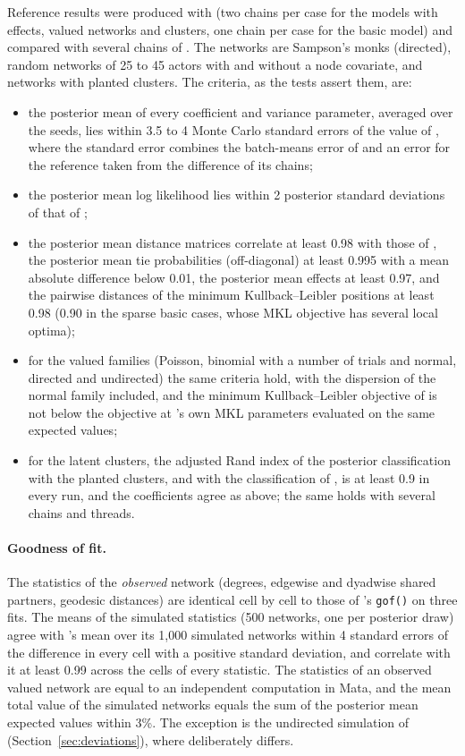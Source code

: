 Reference results were produced with \latentnet{} (two chains per case for the models with effects, valued networks and clusters, one chain per case for the basic model) and compared with several chains of \nwlsm{}. The networks are Sampson's monks (directed), random networks of 25 to 45 actors with and without a node covariate, and networks with planted clusters. The criteria, as the tests assert them, are:
\begin{itemize}[nosep]
  \item the posterior mean of every coefficient and variance parameter, averaged over the seeds, lies within 3.5 to 4 Monte Carlo standard errors of the value of \latentnet{}, where the standard error combines the batch-means error of \nwlsm{} and an error for the reference taken from the difference of its chains;
  \item the posterior mean log likelihood lies within 2 posterior standard deviations of that of \latentnet{};
  \item the posterior mean distance matrices correlate at least 0.98 with those of \latentnet{}, the posterior mean tie probabilities (off-diagonal) at least 0.995 with a mean absolute difference below 0.01, the posterior mean effects at least 0.97, and the pairwise distances of the minimum Kullback--Leibler positions at least 0.98 (0.90 in the sparse basic cases, whose MKL objective has several local optima);
  \item for the valued families (Poisson, binomial with a number of trials and normal, directed and undirected) the same criteria hold, with the dispersion of the normal family included, and the minimum Kullback--Leibler objective of \nwlsm{} is not below the objective at \latentnet{}'s own MKL parameters evaluated on the same expected values;
  \item for the latent clusters, the adjusted Rand index of the posterior classification with the planted clusters, and with the classification of \latentnet{}, is at least 0.9 in every run, and the coefficients agree as above; the same holds with several chains and threads.
\end{itemize}

\paragraph{Goodness of fit.} The statistics of the \emph{observed} network (degrees, edgewise and dyadwise shared partners, geodesic distances) are identical cell by cell to those of \latentnet{}'s \texttt{gof()} on three fits. The means of the simulated statistics (500 networks, one per posterior draw) agree with \latentnet{}'s mean over its 1,000 simulated networks within 4 standard errors of the difference in every cell with a positive standard deviation, and correlate with it at least 0.99 across the cells of every statistic. The statistics of an observed valued network are equal to an independent computation in Mata, and the mean total value of the simulated networks equals the sum of the posterior mean expected values within 3\%. The exception is the undirected simulation of \latentnet{} (Section~\ref{sec:deviations}), where \nwlsm{} deliberately differs.

